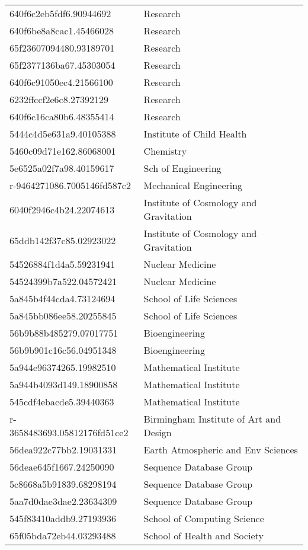 \begin{tabular}{ll}
640f6c2eb5fdf6.90944692 & Research \\
640f6be8a8cac1.45466028 & Research \\
65f23607094480.93189701 & Research \\
65f2377136ba67.45303054 & Research \\
640f6c91050ec4.21566100 & Research \\
6232ffccf2e6c8.27392129 & Research \\
640f6c16ca80b6.48355414 & Research \\
5444c4d5e631a9.40105388 & Institute of Child Health \\
5460c09d71e162.86068001 & Chemistry \\
5e6525a02f7a98.40159617 & Sch of Engineering \\
r-9464271086.7005146fd587c2 & Mechanical Engineering \\
6040f2946c4b24.22074613 & Institute of Cosmology and Gravitation \\
65ddb142f37c85.02923022 & Institute of Cosmology and Gravitation \\
54526884f1d4a5.59231941 & Nuclear Medicine \\
54524399b7a522.04572421 & Nuclear Medicine \\
5a845b4f44cda4.73124694 & School of Life Sciences \\
5a845bb086ee58.20255845 & School of Life Sciences \\
56b9b88b485279.07017751 & Bioengineering \\
56b9b901c16c56.04951348 & Bioengineering \\
5a944e96374265.19982510 & Mathematical Institute \\
5a944b4093d149.18900858 & Mathematical Institute \\
545cdf4ebacde5.39440363 & Mathematical Institute \\
r-3658483693.05812176fd51ce2 & Birmingham Institute of Art and Design \\
56dea922c77bb2.19031331 & Earth Atmospheric and Env Sciences \\
56deae645f1667.24250090 & Sequence Database Group \\
5c8668a5b91839.68298194 & Sequence Database Group \\
5aa7d0dae3dae2.23634309 & Sequence Database Group \\
545f83410addb9.27193936 & School of Computing Science \\
65f05bda72eb44.03293488 & School of Health and Society \\

\end{tabular}
